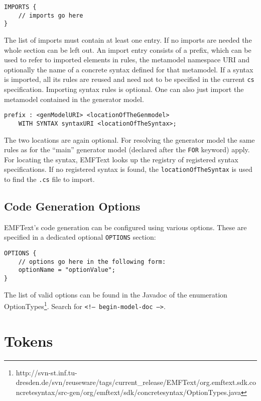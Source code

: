 \begin{lstlisting}
IMPORTS {
    // imports go here
}
\end{lstlisting}

The list of imports must contain at least one entry. If no imports are 
needed the whole section can be left out. An import entry consists of a prefix, 
which can be used to refer to imported elements in rules, the metamodel
namespace URI and optionally the name of a concrete syntax defined for that
metamodel. If a syntax is imported, all its rules are reused and need not to be
specified in the current \texttt{cs} specification. Importing syntax rules is
optional. One can also just import the metamodel contained in the generator model.

\begin{lstlisting}
prefix : <genModelURI> <locationOfTheGenmodel> 
    WITH SYNTAX syntaxURI <locationOfTheSyntax>;
\end{lstlisting}

The two locations are again optional. For resolving the generator model the same
rules as for the ``main'' generator model (declared after the \texttt{FOR}
keyword) apply. For locating the syntax, EMFText looks up the registry of
registered syntax specifications. If no registered syntax is found, the 
\texttt{locationOfTheSyntax} is used to find the \texttt{.cs} file to import.

\subsection{Code Generation Options}

EMFText's code generation can be configured using various options. These are
specified in a dedicated optional \texttt{OPTIONS} section:

\begin{lstlisting}
OPTIONS {
    // options go here in the following form:
    optionName = "optionValue";
}
\end{lstlisting}

The list of valid options can be found in the Javadoc of the enumeration
OptionTypes\footnote{http://svn-st.inf.tu-dresden.de/svn/reuseware/tags/current\_release/EMFText/org.emftext.sdk.concretesyntax/src-gen/org/emftext/sdk/concretesyntax/OptionTypes.java}.
Search for \texttt{<!-- begin-model-doc -->}.

\section{Tokens}

